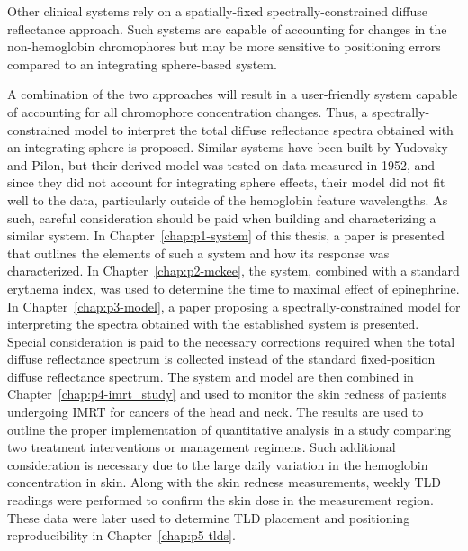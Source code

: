 Other clinical systems rely on a spatially-fixed spectrally-constrained diffuse reflectance approach.\cite{Kim2010} Such systems are capable of accounting for changes in the non-hemoglobin chromophores but may be more sensitive to positioning errors compared to an integrating sphere-based system.

A combination of the two approaches will result in a user-friendly system capable of accounting for all chromophore concentration changes. Thus, a spectrally-constrained model to interpret the total diffuse reflectance spectra obtained with an integrating sphere is proposed. Similar systems have been built by Yudovsky and Pilon,\cite{Yudovsky2010a,Yudovsky2011} but their derived model was tested on data measured in 1952, and since they did not account for integrating sphere effects, their model did not fit well to the data, particularly outside of the hemoglobin feature wavelengths. As such, careful consideration should be paid when building and characterizing a similar system. In Chapter~\ref{chap:p1-system} of this thesis, a paper is presented that outlines the elements of such a system and how its response was characterized. In Chapter~\ref{chap:p2-mckee}, the system, combined with a standard erythema index, was used to determine the time to maximal effect of epinephrine. In Chapter~\ref{chap:p3-model}, a paper proposing a spectrally-constrained model for interpreting the spectra obtained with the established system is presented. Special consideration is paid to the necessary corrections required when the total diffuse reflectance spectrum is collected instead of the standard fixed-position diffuse reflectance spectrum. The system and model are then combined in Chapter~\ref{chap:p4-imrt_study} and used to monitor the skin redness of patients undergoing IMRT for cancers of the head and neck. The results are used to outline the proper implementation of quantitative analysis in a study comparing two treatment interventions or management regimens. Such additional consideration is necessary due to the large daily variation in the hemoglobin concentration in skin. Along with the skin redness measurements, weekly TLD readings were performed to confirm the skin dose in the measurement region. These data were later used to determine TLD placement and positioning reproducibility in Chapter~\ref{chap:p5-tlds}.